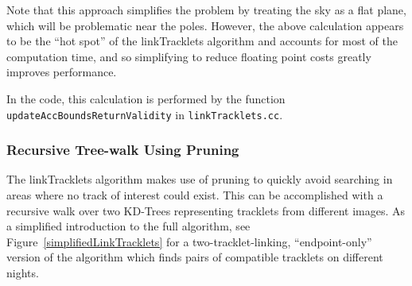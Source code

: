 Note that this approach simplifies the problem by treating the sky as
a flat plane, which will be problematic near the poles.  However, the
above calculation appears to be the ``hot spot'' of the linkTracklets
algorithm and accounts for most of the computation time, and so
simplifying to reduce floating point costs greatly improves
performance.

In the code, this calculation is performed by the function 
{\tt updateAccBoundsReturnValidity} in {\tt linkTracklets.cc}.

\subsubsection{Recursive Tree-walk Using Pruning}

The linkTracklets algorithm makes use of pruning to quickly avoid
searching in areas where no track of interest could exist.  This can
be accomplished with a recursive walk over two KD-Trees representing
tracklets from different images.  As a simplified introduction to the
full algorithm, see Figure~\ref{simplifiedLinkTracklets} for a
two-tracklet-linking, ``endpoint-only'' version of the algorithm which
finds pairs of compatible tracklets on different nights.

